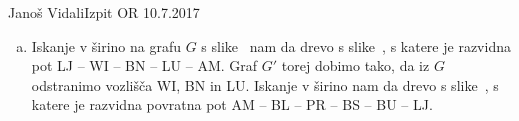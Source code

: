 \begin{naloga}{Janoš Vidali}{Izpit OR 10.7.2017}
\begin{odgovor}
\begin{enumerate}[(a)]
\item Iskanje v širino na grafu $G$ s slike~\fig
nam da drevo s slike~,
s katere je razvidna pot LJ -- WI -- BN -- LU -- AM.
Graf $G'$ torej dobimo tako, da iz $G$ odstranimo vozlišča WI, BN in LU.
Iskanje v širino nam da drevo s slike~,
s katere je razvidna povratna pot AM -- BL -- PR -- BS -- BU -- LJ.
\end{enumerate}
%
\begin{slika}
\end{slika}
%
\begin{slika}
\end{slika}
\end{odgovor}
\end{naloga}
